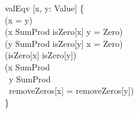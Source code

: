 \begin{myquote}
\Bpred valEqv [x, y: Value] \{\\
\TA (x = y)\\
\TA \Bor (x \Bin SumProd \Band isZero[x] \Band y = Zero)\\
\TA \Bor (y \Bin SumProd \Band isZero[y] \Band x = Zero)\\
\TA \Bor (isZero[x] \Band isZero[y])\\
\TA \Bor (x \Bin SumProd \Band\\
\TB \ y \Bin SumProd \Band\\
\TB \ removeZeros[x] = removeZeros[y])\\
\}
\end{myquote}